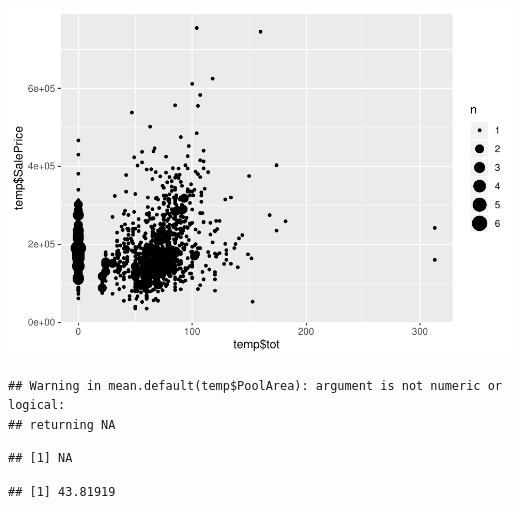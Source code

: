 \documentclass[]{article}
\newenvironment{Shaded}{\begin{snugshade}}{\end{snugshade}}
\newcommand{\KeywordTok}[1]{\textcolor[rgb]{0.13,0.29,0.53}{\textbf{#1}}}
\newcommand{\OperatorTok}[1]{\textcolor[rgb]{0.81,0.36,0.00}{\textbf{#1}}}
\newcommand{\NormalTok}[1]{#1}
\begin{document}
\includegraphics{EDA_files/figure-latex/unnamed-chunk-113-16.pdf}

\begin{Shaded}
\end{Shaded}

\begin{verbatim}
## Warning in mean.default(temp$PoolArea): argument is not numeric or logical:
## returning NA
\end{verbatim}

\begin{verbatim}
## [1] NA
\end{verbatim}

\begin{Shaded}
\end{Shaded}

\begin{verbatim}
## [1] 43.81919
\end{verbatim}

\begin{Shaded}
\end{Shaded}
\end{document}
